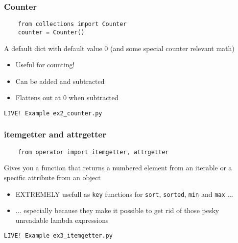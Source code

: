 \documentclass{beamer}
\begin{document}
\begin{frame}[fragile]
  \frametitle{Counter}
  \begin{verbatim}
    from collections import Counter
    counter = Counter()
  \end{verbatim}
  \begin{block}{\vspace*{-3ex}}
    A default dict with default value 0 (and some special counter
    relevant math)
  \end{block}
  \begin{itemize}
  \item Useful for counting!
  \item Can be added and subtracted
  \item Flattens out at 0 when subtracted
  \end{itemize}
  \begin{center}
    \texttt{LIVE! Example ex2\_counter.py}
  \end{center}
\end{frame}

\begin{frame}[fragile]
  \frametitle{itemgetter and attrgetter}
  \begin{verbatim}
    from operator import itemgetter, attrgetter
  \end{verbatim}
  \begin{block}{\vspace*{-3ex}}
    Gives you a function that returns a numbered element from an
    iterable or a specific attribute from an object
  \end{block}
  \begin{itemize}
  \item {\color{darkred}EXTREMELY} usefull as \texttt{key} functions for
    \texttt{sort}, \texttt{sorted}, \texttt{min} and \texttt{max} ...
  \item ... especially because they make it possible to get rid of
    those pesky unreadable lambda expressions
  \end{itemize}
  \begin{center}
    \texttt{LIVE! Example ex3\_itemgetter.py}
  \end{center}
\end{frame}

\end{document}
